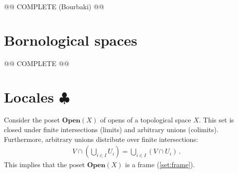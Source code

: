     @@ COMPLETE (Bourbaki) @@

\section{Bornological spaces}


    @@ COMPLETE @@

\section{\texorpdfstring{Locales $\clubsuit$}{Locales}}

    \begin{property}
        Consider the poset $\mathbf{Open}(X)$ of opens of a topological space $X$. This set is closed under finite intersections (limits) and arbitrary unions (colimits). Furthermore, arbitrary unions distribute over finite intersections:
        \begin{gather}
            V\cap\left(\bigcup_{i\in I}U_i\right) = \bigcup_{i\in I}\left(V\cap U_i\right)\,.
        \end{gather}
        This implies that the poset $\mathbf{Open}(X)$ is a frame (\cref{set:frame}).
    \end{property}

